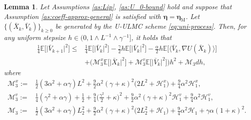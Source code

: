 \documentclass[12pt]{article}
\numberwithin{equation}{section}
\renewcommand{\H}{\mathcal{H}}
\newcommand{\M}{\mathcal{M}}
\newtheorem{lem}{Lemma}[section]
\begin{document}
\begin{lem}
\label{lem:velocity-one-step}
Let Assumptions \ref{as:Lip}, \ref{as:U_0-bound} hold and suppose that Assumption \ref{as:coeff-approx-general} is satisfied with $\boldsymbol{\eta}=\boldsymbol{\eta}_{\mathrm M}$. Let $\{(\bar{X}_k,\bar{V}_k)\}_{k\geq0}$ be generated by the U-ULMC scheme \eqref{eq:uni-process}. Then, for any uniform stepsize $h\in(0,1\wedge L^{-1}\wedge\gamma^{-1}]$, it holds that
\begin{equation}
\label{eq:velocity-one-step}
\begin{aligned}
\tfrac{1}{4}
\mathbb{E}
\Big[
\big|
\bar{V}_{k+1}
\big|^2
\Big]
\leq&
\tfrac{1}{4}
\mathbb{E}
\Big[
\big|
\bar{V}_{k}
\big|^2
\Big]
-
\tfrac{\gamma}{2}h
\mathbb{E}
\Big[
\big|
\bar{V}_{k}
\big|^2
\Big]
-
\tfrac{\alpha}{2}h
\mathbb{E}
\Big[
\big\langle
\bar{V}_k,
\nabla U(\bar{X}_k)
\big\rangle
\Big]
\\
&+
\Big(
\M^x_3
\mathbb{E}
\Big[
\big|
\bar{X}_k
\big|^2
\Big]
+
\M^v_3
\mathbb{E}
\Big[
\big|
\bar{V}_k
\big|^2
\Big]
\Big)h^2
+
\M_3dh,
\end{aligned}
\end{equation}
where
\begin{equation}
\label{eq:M3-constants}
\begin{aligned}
\M^x_3
:=&
\tfrac{1}{2}
(3\alpha^2+\alpha\gamma)L^2
+
\tfrac{9}{2}
\alpha^2(\gamma+\kappa)^2
\big(
2L^2+\H_1^x
\big)
+
\tfrac{9}{4}
\alpha^2\H_1^x,
\\
\M^v_3
:=&
\tfrac{1}{4}
(\gamma^2+\alpha\gamma)
+
\tfrac{1}{2}
+
\tfrac{9}{4}
\big(
\tfrac{\gamma^2}{2}+\kappa
\big)^2
+
\tfrac{9}{2}
\alpha^2(\gamma+\kappa)^2
\H_1^v
+
\tfrac{9}{4}
\alpha^2\H_1^v,
\\
\M_3
:=&
\tfrac{1}{2}
(3\alpha^2+\alpha\gamma)
L_2^2
+
\tfrac{9}{2}
\alpha^2(\gamma+\kappa)^2
\big(
2L_2^2+\H_1
\big)
+
\tfrac{9}{4}
\alpha^2\H_1
+
\gamma\alpha(1+\kappa)^2.
\end{aligned}
\end{equation}
\end{lem}
\end{document}
